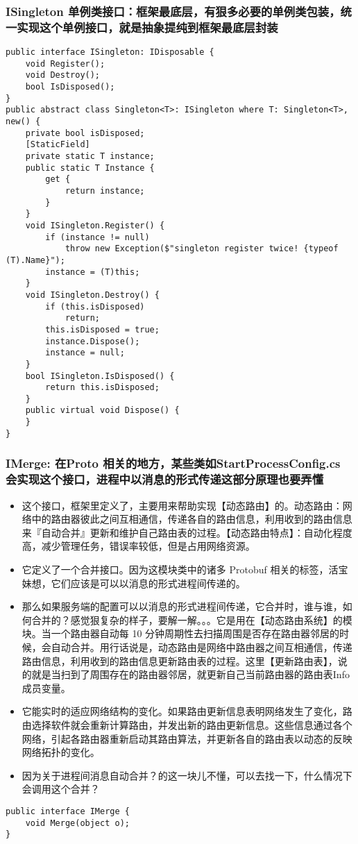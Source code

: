 \documentclass[9pt, b5paper]{article}
\begin{document}
\subsubsection{ISingleton 单例类接口：框架最底层，有狠多必要的单例类包装，统一实现这个单例接口，就是抽象提纯到框架最底层封装}
\label{sec-2-3-3}
\begin{verbatim}
public interface ISingleton: IDisposable {
    void Register();
    void Destroy();
    bool IsDisposed();
}
public abstract class Singleton<T>: ISingleton where T: Singleton<T>, new() {
    private bool isDisposed;
    [StaticField]
    private static T instance;
    public static T Instance {
        get {
            return instance;
        }
    }
    void ISingleton.Register() {
        if (instance != null) 
            throw new Exception($"singleton register twice! {typeof (T).Name}");
        instance = (T)this;
    }
    void ISingleton.Destroy() {
        if (this.isDisposed) 
            return;
        this.isDisposed = true;
        instance.Dispose();
        instance = null;
    }
    bool ISingleton.IsDisposed() {
        return this.isDisposed;
    }
    public virtual void Dispose() {
    }
}
\end{verbatim}
\subsubsection{IMerge: 在Proto 相关的地方，某些类如StartProcessConfig.cs 会实现这个接口，进程中以消息的形式传递这部分原理也要弄懂}
\label{sec-2-3-4}
\begin{itemize}
\item 这个接口，框架里定义了，主要用来帮助实现【动态路由】的。动态路由：网络中的路由器彼此之间互相通信，传递各自的路由信息，利用收到的路由信息来『自动合并』更新和维护自己路由表的过程。【动态路由特点】：自动化程度高，减少管理任务，错误率较低，但是占用网络资源。
\item 它定义了一个合并接口。因为这模块类中的诸多 Protobuf 相关的标签，活宝妹想，它们应该是可以以消息的形式进程间传递的。
\item 那么如果服务端的配置可以以消息的形式进程间传递，它合并时，谁与谁，如何合并的？感觉狠复杂的样子，要解一解。。。它是用在【动态路由系统】的模块。当一个路由器自动每 10 分钟周期性去扫描周围是否存在路由器邻居的时候，会自动合并。用行话说是，动态路由是网络中路由器之间互相通信，传递路由信息，利用收到的路由信息更新路由表的过程。这里【更新路由表】，说的就是当扫到了周围存在的路由器邻居，就更新自己当前路由器的路由表Info 成员变量。
\item 它能实时的适应网络结构的变化。如果路由更新信息表明网络发生了变化，路由选择软件就会重新计算路由，并发出新的路由更新信息。这些信息通过各个网络，引起各路由器重新启动其路由算法，并更新各自的路由表以动态的反映网络拓扑的变化。
\item 因为关于进程间消息自动合并？的这一块儿不懂，可以去找一下，什么情况下会调用这个合并？
\end{itemize}
\begin{verbatim}
public interface IMerge {
    void Merge(object o);
}
\end{verbatim}
\end{document}
